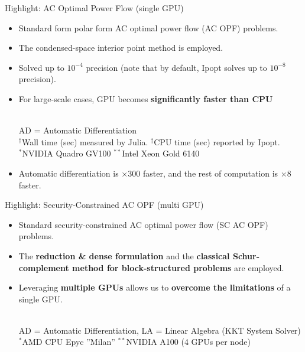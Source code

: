 \begin{frame}{Highlight: AC Optimal Power Flow {\normalsize (single GPU)}}
  \begin{itemize}
  \item<1-> Standard form polar form AC optimal power flow (AC OPF) problems.
  \item<1-> The condensed-space interior point method is employed.
  \item<1-> Solved up to $10^{-4}$ precision (note that by default, Ipopt solves up to $10^{-8}$ precision).
  \item<2-> For large-scale cases, GPU becomes {\bf significantly faster than CPU } 
    \vspace{.1in}
    \begin{center}
      \scriptsize
      \\
      AD = Automatic Differentiation\\
      $^\dag$Wall time (sec) measured by Julia. $^\ddag$CPU time (sec) reported by Ipopt.\\
      $^*$NVIDIA Quadro GV100  $^{**}$Intel Xeon Gold 6140
    \end{center}
  \item<4-> Automatic differentiation is $\times 300$ faster, and the rest of computation is $\times 8$ faster. 
  \end{itemize}
\end{frame}

\begin{frame}{Highlight: Security-Constrained AC OPF {\normalsize (multi GPU)}}
  \begin{itemize}
  \item<1-> Standard security-constrained AC optimal power flow (SC AC OPF) problems.
  \item<1-> The {\bf reduction \& dense formulation} and the {\bf classical Schur-complement method for block-structured problems} are employed.
  \item<2-> Leveraging {\bf multiple GPUs} allows us to {\bf overcome the limitations} of a single GPU.
    \vspace{.1in}
    \begin{center}
      \scriptsize
      \\
      AD = Automatic Differentiation, LA = Linear Algebra (KKT System Solver)\\
      $^{*}$AMD CPU Epyc ”Milan” $^{**}$NVIDIA A100 (4 GPUs per node) 
    \end{center}
  \end{itemize}
\end{frame}

